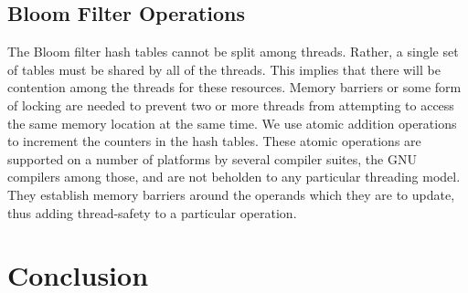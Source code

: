 \documentclass{article}
\begin{document}
\subsection{Bloom Filter Operations}

The Bloom filter hash tables cannot be split among threads. Rather, a single set of tables must be shared by all of the threads. This implies that there will be contention among the threads for these resources. Memory barriers or some form of locking are needed to prevent two or more threads from attempting to access the same memory location at the same time. We use atomic addition operations to increment the counters in the hash tables. These atomic operations are supported on a number of platforms by several compiler suites, the GNU compilers among those, and are not beholden to any particular threading model. They establish memory barriers around the operands which they are to update, thus adding thread-safety to a particular operation.

\section{Conclusion}





\end{document}
